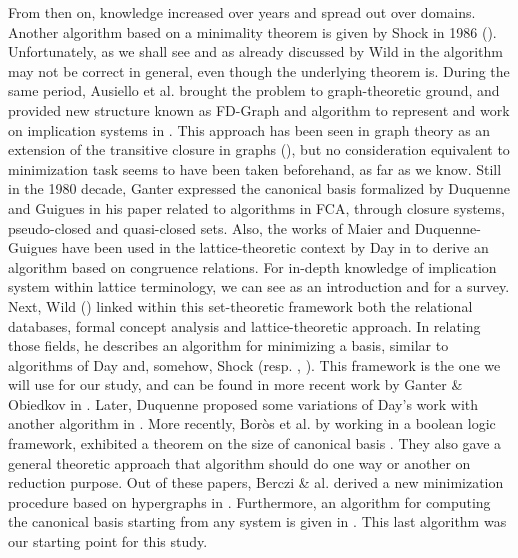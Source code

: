 \documentclass[a4paper, 10pt]{article}
\begin{document}
From then on, knowledge increased over years and spread out over domains. 
Another algorithm based on a minimality theorem is given by Shock in 1986 
(\cite{shock_computing_1986}). Unfortunately, as we shall see and as already 
discussed by Wild in \cite{wild_computations_1995} the algorithm may not be
correct in general, even though the underlying theorem is. During the same 
period, Ausiello et al. brought the problem to graph-theoretic ground, and 
provided new structure known as FD-Graph and algorithm to represent 
and work on implication systems in \cite{ausiello_directed_2017, 
	ausiello_graph_1983, ausiello_minimal_1986}. This approach has been seen in 
graph theory as an extension of the transitive closure in graphs 
(\cite{aho_transitive_2006}), but no consideration equivalent to minimization 
task seems to have been taken beforehand, as far as we know. Still in the 1980 
decade, Ganter expressed the canonical basis formalized by Duquenne and Guigues 
in his paper related to algorithms in FCA, \cite{ganter_two_2010} through 
closure systems, pseudo-closed and quasi-closed sets. Also, the works of Maier and Duquenne-Guigues have been used in the lattice-theoretic context by Day in 
\cite{day_lattice_1992} to derive an algorithm based on congruence relations. 
For in-depth knowledge of implication system within lattice terminology, we can 
see \cite{davey_introduction_2002} as an introduction and 
\cite{bertet_lattices_2016} for a survey. Next, Wild  (\cite{wild_implicational_1989, wild_theory_1994, wild_computations_1995}) 
linked within this set-theoretic framework both the relational databases, 
formal concept analysis and lattice-theoretic approach. In relating those 
fields, he describes an algorithm for minimizing a basis, similar to algorithms 
of Day and, somehow, Shock (resp. \cite{day_lattice_1992},  
\cite{shock_computing_1986}). This framework is the one we will use for our 
study, and can be found in more recent work by Ganter \& Obiedkov in 
\cite{ganter_conceptual_2016}. Later, Duquenne proposed some 
variations of Day's work with another algorithm in 
\cite{duquenne_variations_2007}. More recently, Bor\`os et al. by 
working in a boolean logic framework, exhibited a theorem on the size of
canonical basis \cite{boros_exclusive_2010, boros_strong_2017}. They also gave
a general theoretic approach that algorithm should do one way or another on
reduction purpose. Out of these papers, Berczi \& al. derived a new 
minimization procedure based on hypergraphs in \cite{berczi_directed_2017}. 
Furthermore, an algorithm for computing the canonical basis starting from any 
system is given in \cite{ganter_conceptual_2016}. This last algorithm was our starting point for this study.
\end{document}
